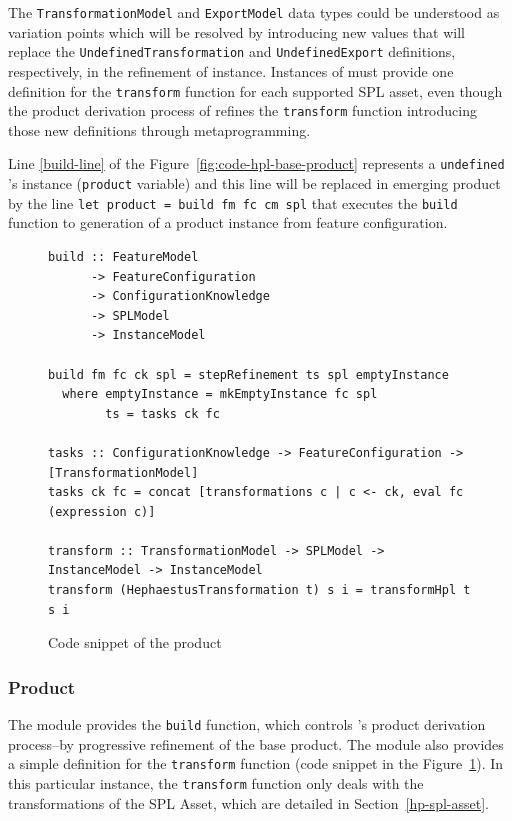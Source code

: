 The \texttt{TransformationModel} and \texttt{ExportModel} data types could be understood as variation points which will be resolved by introducing new values ​​that will replace the \texttt{UndefinedTransformation} and \texttt{UndefinedExport} definitions, respectively, in the refinement of \hpl{} instance. Instances of \hpl{} must provide one definition for the \texttt{transform} function for each supported SPL asset, even though the product derivation process of \hpl{} refines the \texttt{transform} function introducing those new definitions through metaprogramming.

Line \ref{build-line} of the Figure~\ref{fig:code-hpl-base-product} represents a \texttt{undefined} \hpl's instance (\texttt{product} variable) and this line will be replaced in emerging product by the line \texttt{let product = build fm fc cm spl} that executes the \texttt{build} function to generation of a product \hpl{} instance from feature configuration.


\begin{figure}[t!]
\begin{lstlisting}
build :: FeatureModel
      -> FeatureConfiguration
      -> ConfigurationKnowledge
      -> SPLModel
      -> InstanceModel

build fm fc ck spl = stepRefinement ts spl emptyInstance
  where emptyInstance = mkEmptyInstance fc spl
        ts = tasks ck fc

tasks :: ConfigurationKnowledge -> FeatureConfiguration -> [TransformationModel]
tasks ck fc = concat [transformations c | c <- ck, eval fc (expression c)]

transform :: TransformationModel -> SPLModel -> InstanceModel -> InstanceModel
transform (HephaestusTransformation t) s i = transformHpl t s i
\end{lstlisting}
\caption{Code snippet of the \hp{} product}
\label{fig:code-hp-product}
\end{figure}


\subsubsection{\hp{} Product} 
\label{hp-product}

The module provides the \texttt{build} function, which controls \hpl{}'s product derivation process--by progressive refinement of the base product. The module also provides a simple definition for the \texttt{transform} function (code snippet in the Figure~\ref{fig:code-hp-product}).  In this particular instance, the \texttt{transform} function only deals with the transformations of the \hp{} SPL Asset, which are detailed in Section~\ref{hp-spl-asset}.

